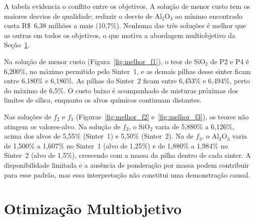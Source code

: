 \documentclass[conference]{IEEEtran}
\begin{document}
A tabela evidencia o conflito entre os objetivos. A solução de menor custo tem os maiores desvios de qualidade; reduzir o desvio de Al$_2$O$_3$ ao mínimo encontrado custa R\$~6{,}38 milhões a mais (10{,}7\%). Nenhuma das três soluções é melhor que as outras em todos os objetivos, o que motiva a abordagem multiobjetivo da Seção~\ref{sec:multi}.

Na solução de menor custo (Figura~\ref{fig:melhor_f1}), o teor de SiO$_2$ de P2 e P4 é 6{,}200\%, no máximo permitido pelo Sinter~1, e as demais pilhas desse sinter ficam entre 6{,}180\% e 6{,}186\%. As pilhas do Sinter~2 ficam entre 6{,}453\% e 6{,}494\%, perto do máximo de 6{,}5\%. O custo baixo é acompanhado de misturas próximas dos limites de sílica, enquanto os alvos químicos continuam distantes.

Nas soluções de $f_2$ e $f_3$ (Figuras~\ref{fig:melhor_f2} e~\ref{fig:melhor_f3}), os teores não atingem os valores-alvo. Na solução de $f_2$, o SiO$_2$ varia de 5{,}880\% a 6{,}126\%, acima dos alvos de 5{,}55\% (Sinter~1) e 5{,}50\% (Sinter~2). Na de $f_3$, o Al$_2$O$_3$ varia de 1{,}500\% a 1{,}607\% no Sinter~1 (alvo de 1{,}25\%) e de 1{,}880\% a 1{,}984\% no Sinter~2 (alvo de 1{,}5\%), crescendo com a massa da pilha dentro de cada sinter. A disponibilidade limitada e a ausência de ponderação por massa podem contribuir para esse padrão, mas essa interpretação não constitui uma demonstração causal.


\section{Otimização Multiobjetivo}\label{sec:multi}
\end{document}
